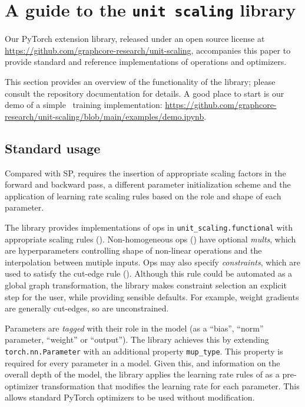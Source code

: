 \section{A guide to the \texttt{unit scaling} library} \label{app:us_lib_guide}

Our PyTorch \citep{pytorch} extension library, released under an open source license at \url{https://github.com/graphcore-research/unit-scaling}, accompanies this paper to provide standard and reference implementations of \umup{} operations and optimizers.

This section provides an overview of the functionality of the library; please consult the repository documentation for details. A good place to start is our demo of a simple \umup\ training implementation: \url{https://github.com/graphcore-research/unit-scaling/blob/main/examples/demo.ipynb}.

\subsection{Standard usage}

Compared with SP, \umup{} requires the insertion of appropriate scaling factors in the forward and backward pass, a different parameter initialization scheme and the application of learning rate scaling rules based on the role and shape of each parameter.

The library provides implementations of ops in \texttt{unit\_scaling.functional} with appropriate scaling rules (). Non-homogeneous ops () have optional \emph{mults}, which are hyperparameters controlling shape of non-linear operations and the interpolation between mutiple inputs. Ops may also specify \emph{constraints}, which are used to satisfy the cut-edge rule (). Although this rule could be automated as a global graph transformation, the library makes constraint selection an explicit step for the user, while providing sensible defaults. For example, weight gradients are generally cut-edges, so are unconstrained.

Parameters are \emph{tagged} with their role in the model (as a ``bias'', ``norm'' parameter, ``weight'' or ``output''). The library achieves this by extending \texttt{torch.nn.Parameter} with an additional property \texttt{mup\_type}. This property is required for every parameter in a \umup{} model. Given this, and information on the overall depth of the model, the library applies the learning rate rules of  as a pre-optimizer transformation that modifies the learning rate for each parameter. This allows standard PyTorch optimizers to be used without modification.

